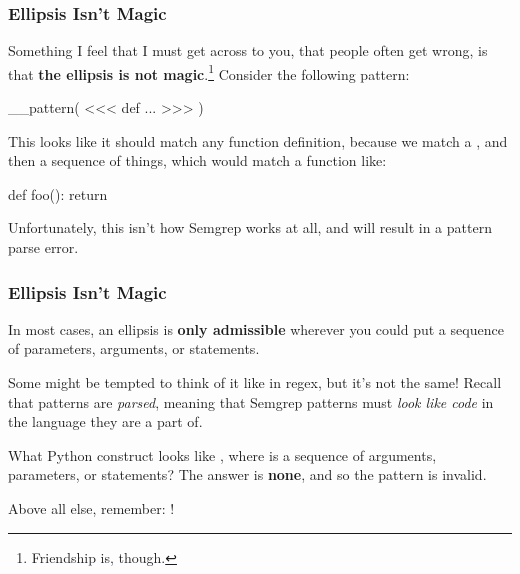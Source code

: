 \documentclass[aspectratio=169, handout]{beamer}
\begin{document}
\begin{frame}[fragile]
  \frametitle{Ellipsis Isn't Magic}

  Something I feel that I must get across to you, that people often get wrong, is that
  \textbf{the ellipsis is not magic}.\footnote{Friendship is, though.} Consider the following pattern:

  \pause
  \vspace{\fill}
  __pattern(
<<<
  def ...
>>>
  )

  \pause
  \vspace{\fill}

  This looks like it should match any function definition, because we match a ,
  and then a sequence of things, which would match a function like:

  \vspace{\fill}

  \begin{pythoncodeblock}
    def foo():
      return
  \end{pythoncodeblock}

  \pause
  \vspace{\fill}

  Unfortunately, this isn't how Semgrep works at all, and will result in a pattern parse error.
\end{frame}

\begin{frame}[fragile]
  \frametitle{Ellipsis Isn't Magic}

  In most cases, an ellipsis is \textbf{only admissible} wherever you could put a sequence
  of parameters, arguments, or statements.

  \pause
  \vspace{\fill}

  Some might be tempted to think of it like  in regex, but it's not the same! Recall
  that patterns are \textit{parsed}, meaning that Semgrep patterns must \textit{look like code}
  in the language they are a part of.

  \pause
  \vspace{\fill}

  What Python construct looks like , where  is a sequence of arguments,
  parameters, or statements? The answer is \textbf{none}, and so the pattern is invalid.

  \pause
  \vspace{\fill}

  Above all else, remember: !
\end{frame}
\end{document}
